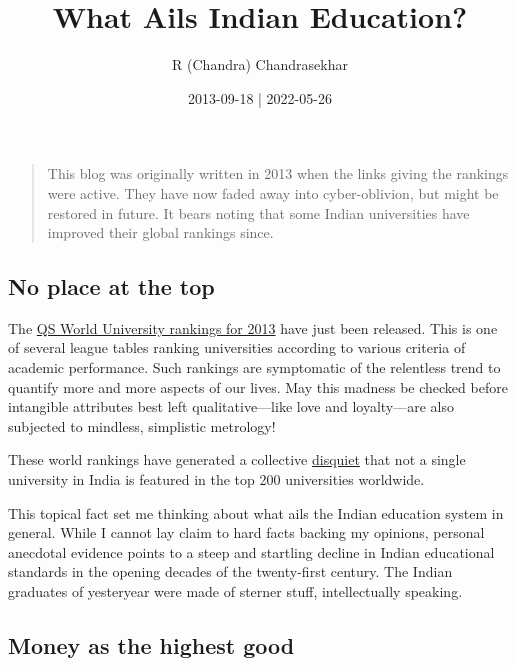 \documentclass[
  a4paper,
]{article}
\title{What Ails Indian Education?}
\author{R (Chandra) Chandrasekhar}
\date{2013-09-18 | 2022-05-26}
\begin{document}
\maketitle




\begin{quote}
This blog was originally written in 2013 when the links giving the
rankings were active. They have now faded away into cyber-oblivion, but
might be restored in future. It bears noting that some Indian
universities have improved their global rankings since.
\end{quote}

\hypertarget{no-place-at-the-top}{%
\subsection{No place at the top}\label{no-place-at-the-top}}

The
\href{http://www.topuniversities.com/university-rankings/world-university-rankings/2013\#sorting=rank+region=+country=+faculty=+stars=false+search=}{QS
World University rankings for 2013} have just been released. This is one
of several league tables ranking universities according to various
criteria of academic performance. Such rankings are symptomatic of the
relentless trend to quantify more and more aspects of our lives. May
this madness be checked before intangible attributes best left
qualitative---like love and loyalty---are also subjected to mindless,
simplistic metrology!

These world rankings have generated a collective
\href{http://articles.timesofindia.indiatimes.com/2013-09-11/news/41969629_1_qs-world-university-rankings-mumbai-university-indian}{disquiet}
that not a single university in India is featured in the top 200
universities worldwide.

This topical fact set me thinking about what ails the Indian education
system in general. While I cannot lay claim to hard facts backing my
opinions, personal anecdotal evidence points to a steep and startling
decline in Indian educational standards in the opening decades of the
twenty-first century. The Indian graduates of yesteryear were made of
sterner stuff, intellectually speaking.

\hypertarget{money-as-the-highest-good}{%
\subsection{Money as the highest good}\label{money-as-the-highest-good}}
\end{document}
